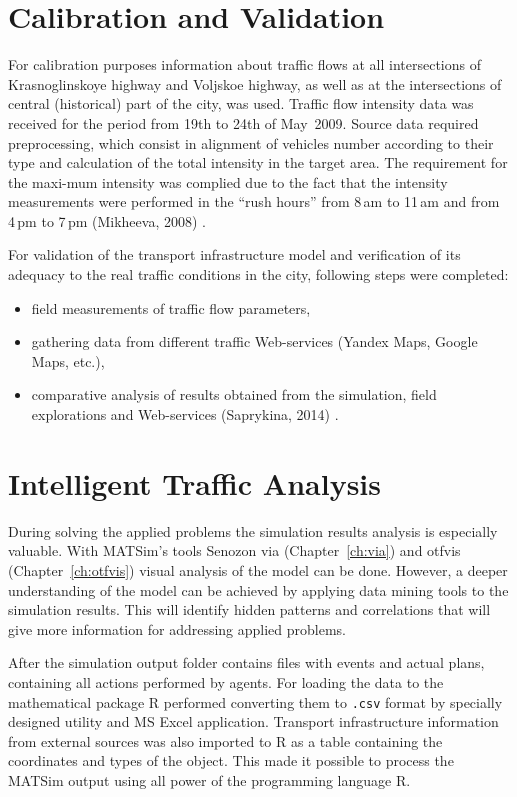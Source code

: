 \section{Calibration and Validation}
For calibration purposes information about traffic flows at all intersections of Krasnoglinskoye highway and Voljskoe highway, as well as at the intersections of central (historical) part of the city, was used. Traffic flow intensity data was received for the period from 19th to 24th of May~2009. Source data required preprocessing, which consist in alignment of vehicles number according to their type and calculation of the total intensity in the target area. The requirement for the maxi-mum intensity was complied due to the fact that the intensity measurements were performed in the ``rush hours'' from 8\,am to 11\,am and from 4\,pm to 7\,pm (Mikheeva, 2008) \citep[][]{}. 

For validation of the transport infrastructure model and verification of its adequacy to the real traffic conditions in the city, following steps were completed: 
\begin{itemize}
\item field measurements of traffic flow parameters,
\item gathering data from different traffic Web-services (Yandex Maps, Google Maps, etc.),
\item comparative analysis of results obtained from the simulation, field explorations and Web-services (Saprykina, 2014) \citep[][]{}.
\end{itemize}

\section{Intelligent Traffic Analysis}
During solving the applied problems the simulation results analysis is especially valuable. 
With MATSim's tools Senozon \gls{via} (Chapter~\ref{ch:via}) and \gls{otfvis} (Chapter~\ref{ch:otfvis}) visual analysis of the model can be done. 
However, a deeper understanding of the model can be achieved by applying data mining tools to the simulation results. 
This will identify hidden patterns and correlations that will give more information for addressing applied problems. 

After the simulation output folder contains files with events and actual plans, containing all actions performed by agents. For loading the data to the mathematical package R performed converting them to \lstinline|.csv| format by specially designed utility and MS Excel application. Transport infrastructure information from external sources was also imported to R as a table containing the coordinates and types of the object. This made it possible to process the MATSim output using all power of the programming language R.

